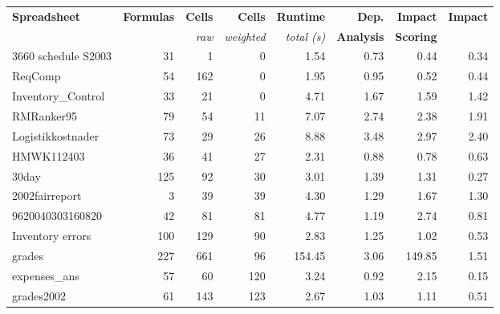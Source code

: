 
\begin{table}[!t]
  \centering \begin{tabular}{l|rrr||r|rrr}
 \small{\bf{Spreadsheet}} & \small{\bf{Formulas}} & \small{\bf{Cells}} & \small{\bf{Cells}} & \small{\bf{Runtime}} & \small{\bf{Dep.}} & \small{\bf{Impact}}   & \small{\bf{Impact}} \\
 & & {\small{\it{raw}}} & {\small{\it{weighted}}} & \small{\it{total (s)}} & \small{\bf{Analysis}} & \small{\bf{Scoring}} \\
\hline
\small{3660 schedule S2003} & \small{31} & \small{1} & \small{0} & \small{1.54} & \small{0.73} & \small{0.44} & \small{0.34} \\ 
\small{ReqComp} & \small{54} & \small{162} & \small{0} & \small{1.95} & \small{0.95} & \small{0.52} & \small{0.44} \\ 
\small{Inventory\_Control} & \small{33} & \small{21} & \small{0} & \small{4.71} & \small{1.67} & \small{1.59} & \small{1.42} \\ 
\small{RMRanker95} & \small{79} & \small{54} & \small{11} & \small{7.07} & \small{2.74} & \small{2.38} & \small{1.91} \\ 
\small{Logistikkostnader} & \small{73} & \small{29} & \small{26} & \small{8.88} & \small{3.48} & \small{2.97} & \small{2.40} \\  
\small{HMWK112403} & \small{36} & \small{41} & \small{27} & \small{2.31} & \small{0.88} & \small{0.78} & \small{0.63} \\ 
\small{30day} & \small{125} & \small{92} & \small{30} & \small{3.01} & \small{1.39} & \small{1.31} & \small{0.27} \\ 
\small{2002fairreport} & \small{3} & \small{39} & \small{39} & \small{4.30} & \small{1.29} & \small{1.67} & \small{1.30} \\ 
\small{9620040303160820} & \small{42} & \small{81} & \small{81} & \small{4.77} & \small{1.19} & \small{2.74} & \small{0.81} \\  
\small{Inventory errors} & \small{100} & \small{129} & \small{90} & \small{2.83} & \small{1.25} & \small{1.02} & \small{0.53} \\ 
\small{grades} & \small{227} & \small{661} & \small{96} & \small{154.45} & \small{3.06} & \small{149.85} & \small{1.51} \\ 
\small{expenses\_ans} & \small{57} & \small{60} & \small{120} & \small{3.24} & \small{0.92} & \small{2.15} & \small{0.15} \\ 
\small{grades2002} & \small{61} & \small{143} & \small{123} & \small{2.67} & \small{1.03} & \small{1.11} & \small{0.51} \\ 

\end{tabular}
\end{table}
